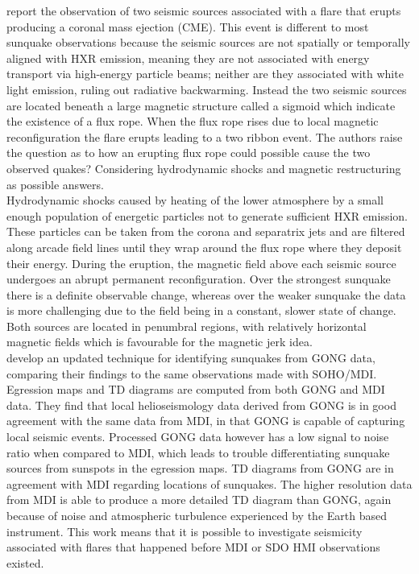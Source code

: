 \documentclass[11pt]{article}
\begin{document}
\cite{2011ApJ...741L..35Z} report the observation of two seismic sources associated with a flare that erupts producing a coronal mass ejection (CME). This event is different to most sunquake observations because the seismic sources are not spatially or temporally aligned with HXR emission, meaning they are not associated with energy transport via high-energy particle beams; neither are they associated with white light emission, ruling out radiative backwarming. Instead the two seismic sources are located beneath a large magnetic structure called a sigmoid which indicate the existence of a flux rope. When the flux rope rises due to local magnetic reconfiguration the flare erupts leading to a two ribbon event. The authors raise the question as to how an erupting flux rope could possible cause the two observed quakes? Considering hydrodynamic shocks and magnetic restructuring as possible answers.\\
Hydrodynamic shocks caused by heating of the lower atmosphere by a small enough population of energetic particles not to generate sufficient HXR emission. These particles can be taken from the corona and separatrix jets and are filtered along arcade field lines until they wrap around the flux rope where they deposit their energy. During the eruption, the magnetic field above each seismic source undergoes an abrupt permanent reconfiguration. Over the strongest sunquake there is a definite observable change, whereas over the weaker sunquake the data is more challenging due to the field being in a constant, slower state of change. Both sources are located in penumbral regions, with relatively horizontal magnetic fields which is favourable for the magnetic jerk idea.\\


\cite{2011ApJ...739...70Z} develop an updated technique for identifying sunquakes from GONG data, comparing their findings to the same observations made with SOHO/MDI. Egression maps and TD diagrams are computed from both GONG and MDI data. They find that local helioseismology data derived from GONG is in good agreement with the same data from MDI, in that GONG is capable of capturing local seismic events. Processed GONG data however has a low signal to noise ratio when compared to MDI, which leads to trouble differentiating sunquake sources from sunspots in the egression maps. TD diagrams from GONG are in agreement with MDI regarding locations of sunquakes. The higher resolution data from MDI is able to produce a more detailed TD diagram than GONG, again because of noise and atmospheric turbulence experienced by the Earth based instrument. This work means that it is possible to investigate seismicity associated with flares that happened before MDI or SDO HMI observations existed.\\    
\end{document}
